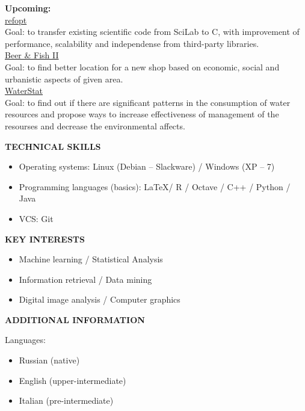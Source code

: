 \documentclass[a4paper,12pt,fullpage]{article}
\begin{document}
\textbf{Upcoming:}\\
\underline{refopt}\\
Goal: to transfer existing scientific code from SciLab to C, with improvement of
 performance, scalability and independense from third-party libraries.\\

\underline{Beer \& Fish II}\\
Goal: to find better location for a new shop based on economic, social and 
urbanistic aspects of given area.\\

\underline{WaterStat}\\
Goal: to find out if there are significant patterns in the consumption of water 
resources and propose ways to increase effectiveness of management of the 
resourses and decrease the environmental affects.\\
\begin{center}
	\textbf{TECHNICAL SKILLS}
\end{center}
\begin{itemize}
	\item Operating systems: Linux (Debian -- Slackware) / Windows (XP -- 7)
	\item Programming languages (basics): \LaTeX / R / Octave / C++ / Python
 / Java 
	\item VCS: Git
\end{itemize}

\begin{center}
	\textbf{KEY INTERESTS}
\end{center}
\begin{itemize}
	\item Machine learning / Statistical Analysis
	\item Information retrieval / Data mining
	\item Digital image analysis / Computer graphics
\end{itemize}

\begin{center}
	\textbf{ADDITIONAL INFORMATION}
\end{center}
Languages: 
\begin{itemize}
	\item Russian (native)
	\item English (upper-intermediate)
	\item Italian (pre-intermediate)
\end{itemize}

\end{document}
